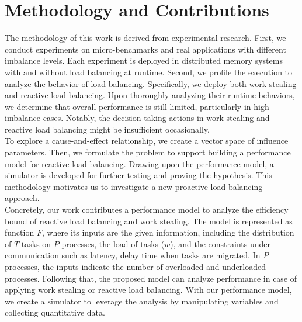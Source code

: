 \section{Methodology and Contributions}
\label{sec:intro_method_contribution}

The methodology of this work is derived from experimental research. First, we conduct experiments on micro-benchmarks and real applications with different imbalance levels. Each experiment is deployed in distributed memory systems with and without load balancing at runtime. Second, we profile the execution to analyze the behavior of load balancing. Specifically, we deploy both work stealing and reactive load balancing. Upon thoroughly analyzing their runtime behaviors, we determine that overall performance is still limited, particularly in high imbalance cases. Notably, the decision taking actions in work stealing and reactive load balancing might be insufficient occasionally.\\

To explore a cause-and-effect relationship, we create a vector space of influence parameters. Then, we formulate the problem to support building a performance model for reactive load balancing. Drawing upon the performance model, a simulator is developed for further testing and proving the hypothesis. This methodology motivates us to investigate a new proactive load balancing approach.\\

Concretely, our work contributes a performance model to analyze the efficiency bound of reactive load balancing and work stealing. The model is represented as function $F$, where its inputs are the given information, including the distribution of $T$ tasks on $P$ processes, the load of tasks ($w$), and the constraints under communication such as latency, delay time when tasks are migrated. In $P$ processes, the inputs indicate the number of overloaded and underloaded processes. Following that, the proposed model can analyze performance in case of applying work stealing or reactive load balancing. With our performance model, we create a simulator to leverage the analysis by manipulating variables and collecting quantitative data. \\


